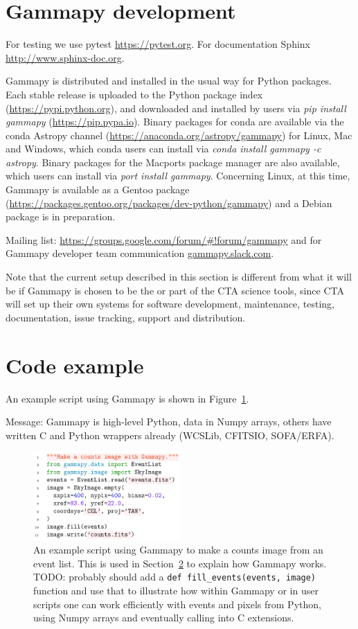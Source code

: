 \documentclass{PoS}
\newcommand{\url}[1]{\href{#1}{#1}}
\begin{document}
\section{Gammapy development}

For testing we use pytest \url{https://pytest.org}.
For documentation Sphinx \url{http://www.sphinx-doc.org}.

Gammapy is distributed and installed in the usual way for Python packages. Each
stable release is uploaded to the Python package index
(\url{https://pypi.python.org}), and downloaded and installed by users via
{\it pip install gammapy} (\url{https://pip.pypa.io}). Binary packages for
conda are available via the conda Astropy channel
(\url{https://anaconda.org/astropy/gammapy}) for Linux, Mac and Windows, which
conda users can install via {\it conda install gammapy -c astropy}. Binary
packages for the Macports package manager are also available, which users can
install via {\it port install gammapy}. Concerning Linux, at this time,
Gammapy is available as a Gentoo package
(\url{https://packages.gentoo.org/packages/dev-python/gammapy}) and a Debian
package is in preparation.

Mailing list: \url{https://groups.google.com/forum/\#!forum/gammapy} and for Gammapy developer team communication \url{gammapy.slack.com}.

Note that the current setup described in this section is different from what it
will be if Gammapy is chosen to be the or part of the CTA science tools, since
CTA will set up their own systems for software development, maintenance,
testing, documentation, issue tracking, support and distribution.

\section{Code example}
\label{sec:code}

An example script using Gammapy is shown in Figure~\ref{fig:code_example}.

Message: Gammapy is high-level Python, data in Numpy arrays, others have written C and Python wrappers already (WCSLib, CFITSIO, SOFA/ERFA).

\begin{figure}[t]
\centering
\includegraphics[width=0.5\textwidth]{examples/code_events_image}
\caption{
An example script using Gammapy to make a counts image from an event list.
This is used in Section~\ref{sec:code} to explain how Gammapy works.
TODO: probably should add a \texttt{def fill\_events(events, image)} function
and use that to illustrate how within Gammapy or in user scripts one can work
efficiently with events and pixels from Python, using Numpy arrays and
eventually calling into C extensions.
}
\label{fig:code_example}
\end{figure}
\end{document}
